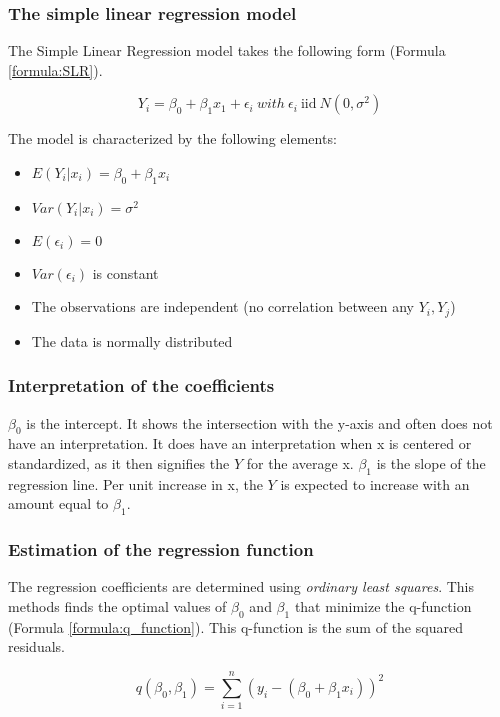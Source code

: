 \subsubsection{The simple linear regression model}

The Simple Linear Regression model takes the following form (Formula \ref{formula:SLR}). 

\begin{equation}
    Y_i = \beta_0 + \beta_1 x_1 + \epsilon_i \ with \ \epsilon_i \ \text{iid} \ N(0, \sigma^2)
    \label{formula:SLR}
\end{equation}

The model is characterized by the following elements:
\begin{itemize}
    \item $E(Y_i|x_i) = \beta_0 + \beta_1 x_i$
    \item $Var(Y_i|x_i) = \sigma^2$
    \item $E(\epsilon_i) = 0$
    \item $Var(\epsilon_i)$ is constant
    \item The observations are independent (no correlation between any $Y_i, Y_j$)
    \item The data is normally distributed
\end{itemize}

\subsubsection{Interpretation of the coefficients}
$\beta_0$ is the intercept.
It shows the intersection with the y-axis and often does not have an interpretation.
It does have an interpretation when x is centered or standardized, as it then signifies the $Y$ for the average x.
$\beta_1$ is the slope of the regression line.
Per unit increase in x, the $Y$ is expected to increase with an amount equal to $\beta_1$.

\subsubsection{Estimation of the regression function}
The regression coefficients are determined using \textit{ordinary least squares}.
This methods finds the optimal values of $\beta_0$ and $\beta_1$ that minimize the q-function (Formula \ref{formula:q_function}).
This q-function is the sum of the squared residuals.

\begin{equation}
    q(\beta_0, \beta_1) = \sum_{i=1}^{n} \left(y_i - (\beta_0 + \beta_1 x_i)\right)^2
    \label{formula:q_function}
\end{equation}

